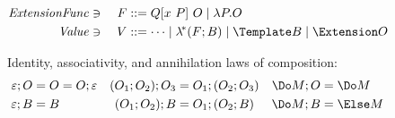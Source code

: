 \documentclass[runningheads]{llncs}
\begin{document}
\begin{figure}
\centering

\begin{alignat*}{2}
  \mathit{ExtensionFunc} &\ni{}& F
  &::= Q[x ~ P] ~ O
  \mid \lambda P. O
  \\
  \mathit{Value} &\ni{}& V
  &::= \dots
  \mid \lamstar (F; B)
  \mid \Template B
  \mid \Extension O
  \\
\end{alignat*}

Identity, associativity, and annihilation laws of composition:
\begin{align*}
  \varepsilon; O &= O = O; \varepsilon
  &
  (O_1; O_2); O_3 &= O_1; (O_2; O_3)
  &
  \Do M; O &= \Do M
  \\
  \varepsilon; B &= B
  &
  (O_1; O_2); B &= O_1; (O_2; B)
  &
  \Do M; B &= \Else M
\end{align*}




\end{figure}
\end{document}
